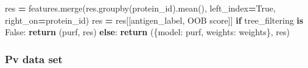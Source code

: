 \documentclass[
  11pt,
  oneside]{book}
\newenvironment{Shaded}{\begin{snugshade}}{\end{snugshade}}
\newcommand{\ControlFlowTok}[1]{\textcolor[rgb]{0.13,0.29,0.53}{\textbf{#1}}}
\newcommand{\KeywordTok}[1]{\textcolor[rgb]{0.13,0.29,0.53}{\textbf{#1}}}
\newcommand{\NormalTok}[1]{#1}
\newcommand{\OperatorTok}[1]{\textcolor[rgb]{0.81,0.36,0.00}{\textbf{#1}}}
\newcommand{\StringTok}[1]{\textcolor[rgb]{0.31,0.60,0.02}{#1}}
\newcommand{\VariableTok}[1]{\textcolor[rgb]{0.00,0.00,0.00}{#1}}
\begin{document}
\begin{Shaded}
\begin{Highlighting}[]
\NormalTok{    res }\OperatorTok{=}\NormalTok{ features.merge(res.groupby(}\StringTok{\textquotesingle{}protein\_id\textquotesingle{}}\NormalTok{).mean(), left\_index}\OperatorTok{=}\VariableTok{True}\NormalTok{, right\_on}\OperatorTok{=}\StringTok{\textquotesingle{}protein\_id\textquotesingle{}}\NormalTok{)}
\NormalTok{    res }\OperatorTok{=}\NormalTok{ res[[}\StringTok{\textquotesingle{}antigen\_label\textquotesingle{}}\NormalTok{, }\StringTok{\textquotesingle{}OOB score\textquotesingle{}}\NormalTok{]]}
    \ControlFlowTok{if}\NormalTok{ tree\_filtering }\KeywordTok{is} \VariableTok{False}\NormalTok{:}
        \ControlFlowTok{return}\NormalTok{ (purf, res)}
    \ControlFlowTok{else}\NormalTok{:}
        \ControlFlowTok{return}\NormalTok{ (\{}\StringTok{\textquotesingle{}model\textquotesingle{}}\NormalTok{: purf, }\StringTok{\textquotesingle{}weights\textquotesingle{}}\NormalTok{: weights\}, res)}
\end{Highlighting}
\end{Shaded}

\hypertarget{pv-data-set-2}{%
\subsubsection{Pv data set}\label{pv-data-set-2}}
\end{document}
